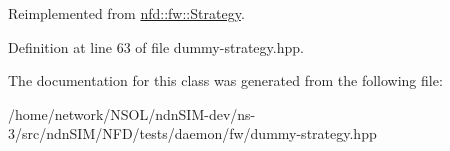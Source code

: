 Reimplemented from \hyperlink{classnfd_1_1fw_1_1Strategy_a31387ec5c8204841e407bced9902c203}{nfd\+::fw\+::\+Strategy}.



Definition at line 63 of file dummy-\/strategy.\+hpp.



The documentation for this class was generated from the following file\+:\begin{DoxyCompactItemize}
\item 
/home/network/\+N\+S\+O\+L/ndn\+S\+I\+M-\/dev/ns-\/3/src/ndn\+S\+I\+M/\+N\+F\+D/tests/daemon/fw/dummy-\/strategy.\+hpp\end{DoxyCompactItemize}
